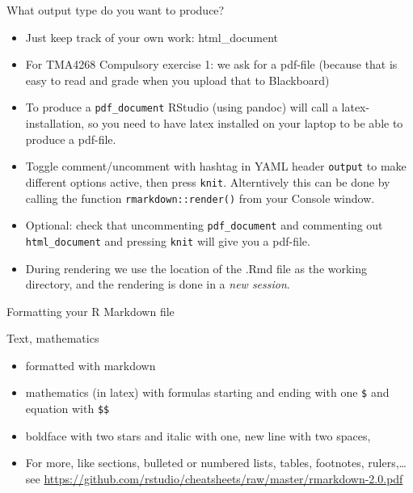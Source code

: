 \documentclass[
  10pt,
  ignorenonframetext,
]{beamer}
\providecommand{\tightlist}{%
  \setlength{\itemsep}{0pt}\setlength{\parskip}{0pt}}
\begin{document}
\begin{frame}[fragile]
\begin{block}{What output type do you want to produce?}
\protect\hypertarget{what-output-type-do-you-want-to-produce}{}
\vspace{2mm}

\begin{itemize}
\item
  Just keep track of your own work: html\_document
\item
  For TMA4268 Compulsory exercise 1: we ask for a pdf-file (because that
  is easy to read and grade when you upload that to Blackboard)
\item
  To produce a \texttt{pdf\_document} RStudio (using pandoc) will call a
  latex-installation, so you need to have latex installed on your laptop
  to be able to produce a pdf-file.
\item
  Toggle comment/uncomment with hashtag in YAML header \texttt{output}
  to make different options active, then press \texttt{knit}.
  Alterntively this can be done by calling the function
  \texttt{rmarkdown::render()} from your Console window.
\item
  Optional: check that uncommenting \texttt{pdf\_document} and
  commenting out \texttt{html\_document} and pressing \texttt{knit} will
  give you a pdf-file.
\item
  During rendering we use the location of the .Rmd file as the working
  directory, and the rendering is done in a \emph{new session}.
\end{itemize}
\end{block}
\end{frame}

\begin{frame}[fragile]{Formatting your R Markdown file}
\protect\hypertarget{formatting-your-r-markdown-file}{}
\begin{block}{Text, mathematics}
\protect\hypertarget{text-mathematics}{}
\begin{itemize}
\tightlist
\item
  formatted with markdown
\item
  mathematics (in latex) with formulas starting and ending with one
  \texttt{\$} and equation with \texttt{\$\$}
\item
  boldface with two stars and italic with one, new line with two spaces,
\item
  For more, like sections, bulleted or numbered lists, tables,
  footnotes, rulers,\ldots{} see
  \url{https://github.com/rstudio/cheatsheets/raw/master/rmarkdown-2.0.pdf}
\end{itemize}
\end{block}
\end{frame}
\end{document}
